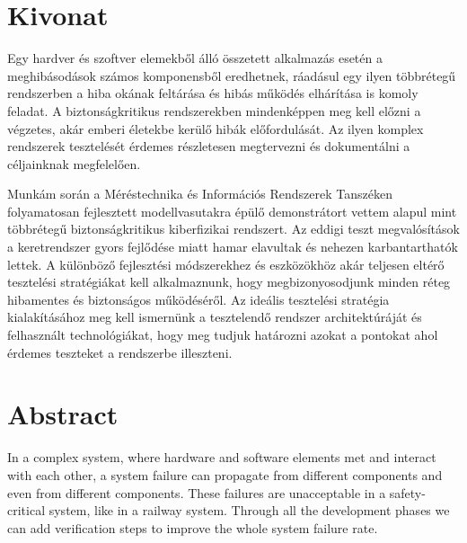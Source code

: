 
\setcounter{page}{1}

\selecthungarian

\chapter*{Kivonat}

Egy hardver és szoftver elemekből álló összetett alkalmazás esetén a meghibásodások számos komponensből eredhetnek, ráadásul egy ilyen többrétegű rendszerben a hiba okának feltárása és hibás működés elhárítása is komoly feladat. A biztonságkritikus rendszerekben mindenképpen meg kell előzni a végzetes, akár emberi életekbe kerülő hibák előfordulását. Az ilyen komplex rendszerek tesztelését érdemes részletesen megtervezni és dokumentálni a céljainknak megfelelően.

Munkám során a Méréstechnika és Információs Rendszerek Tanszéken folyamatosan fejlesztett modellvasutakra épülő demonstrátort vettem alapul mint többrétegű biztonságkritikus kiberfizikai rendszert. Az eddigi teszt megvalósítások a keretrendszer gyors fejlődése miatt hamar elavultak és nehezen karbantarthatók lettek.  A különböző fejlesztési módszerekhez és eszközökhöz akár teljesen eltérő tesztelési stratégiákat kell alkalmaznunk, hogy megbizonyosodjunk minden réteg hibamentes és biztonságos működéséről. Az ideális tesztelési stratégia kialakításához meg kell ismernünk a tesztelendő rendszer architektúráját és felhasznált technológiákat, hogy meg tudjuk határozni azokat a pontokat ahol érdemes teszteket a rendszerbe illeszteni.

\vfill
\selectenglish


\chapter*{Abstract}

In a complex system, where hardware and software  elements met and interact with each other, a system failure can propagate from different components and even from different components. These failures are unacceptable in a safety-critical system, like in a railway system. Through all the development phases we can add verification steps to improve the whole system failure rate.

